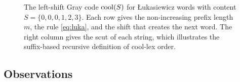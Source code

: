 \begin{figure}
    \caption{The left-shift Gray code $\operatorname{cool}(S)$ for Łukasiewicz words with content $S = \{0,0,0,1,2,3\}$.
    Each row gives the non-increasing prefix length $m$, the rule \eqref{eq:luka}, and the shift that creates the next word.
    The right column gives the scut of each string, which illustrates the suffix-based recursive definition of cool-lex order.}
    \label{fig:LukaTable}
\end{figure}

\subsection{Observations}
\label{sec:prefix_observations}

